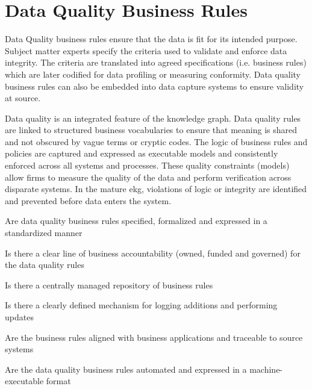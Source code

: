 \section{Data Quality Business Rules}\label{sec:ekgmm-b-3-2} %

Data Quality business rules ensure that the data is fit for its intended purpose.
Subject matter experts specify the criteria used to validate and enforce data integrity.
The criteria are translated into agreed specifications (i.e. business rules) which are later codified for
data profiling or measuring conformity.
Data quality business rules can also be embedded into data capture systems to ensure validity at source.

\kgmmekgrationalesection

Data quality is an integrated feature of the knowledge graph.
Data quality rules are linked to structured business vocabularies to ensure that meaning
is shared and not obscured by vague terms or cryptic codes.
The logic of business rules and policies are captured and expressed as executable models and consistently
enforced across all systems and processes.
These quality constraints (models) allow firms to measure the quality of the data and perform verification across
disparate systems.
In the mature \gls{ekg}, violations of logic or integrity are identified and prevented before data
enters the system.

\kgmmcorequestionssection

\begin{core-questions}

  \item [\thesection.1] Are data quality business rules specified, formalized and expressed in a standardized manner
  \item [\thesection.2] Is there a clear line of business accountability (owned, funded and governed) for the
                        data quality rules
  \item [\thesection.3] Is there a centrally managed repository of business rules
  \item [\thesection.4] Is there a clearly defined mechanism for logging additions and performing updates
  \item [\thesection.5] Are the business rules aligned with business applications and traceable to source systems
  \item [\thesection.6] Are the data quality business rules automated and expressed in a machine-executable format

\end{core-questions}

